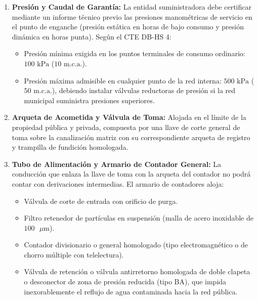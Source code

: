\documentclass{report}
\begin{document}
\begin{enumerate}

    \item \textbf{Presión y Caudal de Garantía:} La entidad suministradora debe certificar mediante un informe técnico previo las presiones manométricas de servicio en el punto de enganche (presión estática en horas de bajo consumo y presión dinámica en horas punta). Según el CTE DB-HS 4:

    \begin{itemize}

        \item Presión mínima exigida en los puntos terminales de consumo ordinario: $100\text{ kPa}$ ($10\text{ m.c.a.}$).

        \item Presión máxima admisible en cualquier punto de la red interna: $500\text{ kPa}$ ($50\text{ m.c.a.}$), debiendo instalar válvulas reductoras de presión si la red municipal suministra presiones superiores.

    \end{itemize}

    \item \textbf{Arqueta de Acometida y Válvula de Toma:} Alojada en el límite de la propiedad pública y privada, compuesta por una llave de corte general de toma sobre la canalización matriz con su correspondiente arqueta de registro y trampilla de fundición homologada.

    \item \textbf{Tubo de Alimentación y Armario de Contador General:} La conducción que enlaza la llave de toma con la arqueta del contador no podrá contar con derivaciones intermedias. El armario de contadores aloja:

    \begin{itemize}

        \item Válvula de corte de entrada con orificio de purga.

        \item Filtro retenedor de partículas en suspensión (malla de acero inoxidable de $100\text{ }\mu\text{m}$).

        \item Contador divisionario o general homologado (tipo electromagnético o de chorro múltiple con telelectura).

        \item Válvula de retención o válvula antirretorno homologada de doble clapeta o desconector de zona de presión reducida (tipo BA), que impida inexorablemente el reflujo de agua contaminada hacia la red pública.


\end{itemize}
\end{enumerate}
\end{document}
